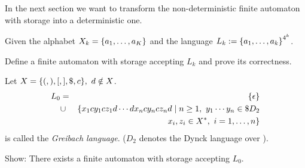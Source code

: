 In the next section we want to transform the non-deterministic finite automaton
with storage into a deterministic one.

\bigskip
\begin{exercise}
Given the alphabet $X_k = \mbox{$\{a_1, \ldots, a_K\}$}$ and the language $L_k :=
\mbox{$\{a_1, \ldots, a_k\}$}^{4^k}$.

Define a finite automaton with storage accepting $L_k$ and prove its
correctness.
\end{exercise}

\bigskip
\begin{exercise}
Let $X = \mbox{$\{(, ), [, ], \$, c\}$},\ d \notin X$.
\begin{eqnarray*}
L_0 &=& \mbox{$\{\epsilon\}$} \\
&\cup& \{x_1 c y_1 c z_1 d \cdots d x_n c y_n c
z_n d \mid n \geq 1,\ y_1 \cdots y_n \in \$ D_2 \\
& & x_i, z_i \in X^*,\ i=1, \ldots, n \} 
\end{eqnarray*}
is called the {\em Greibach language}. ($D_2$ denotes the Dynck language over
\setof{(, ), [, ]}).

Show: There exists a finite automaton with storage accepting $L_0$.
\end{exercise}















































